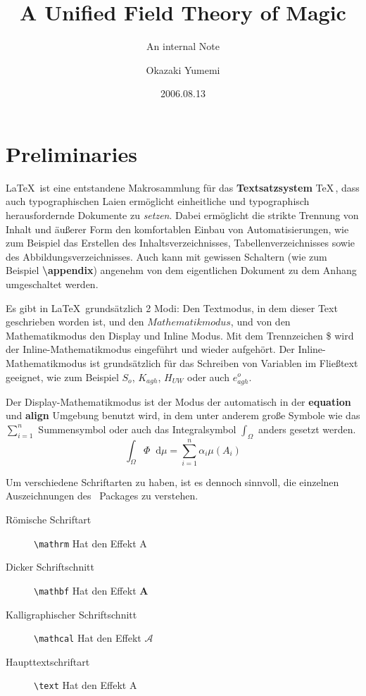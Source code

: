 \documentclass[logo/language=en]{tudcdartcl}
\title{A Unified Field Theory of Magic}
\subtitle{An internal Note}
\author{Okazaki Yumemi}
\date{2006.08.13}
\newcommand{\diff}{\mathop{}\!\mathrm{d}}
\begin{document}
\maketitle%

\section{Preliminaries}


\LaTeX\, ist eine entstandene Makrosammlung für das \textbf{Textsatzsystem} \TeX\,, dass auch typographischen Laien ermöglicht einheitliche und typographisch herausfordernde Dokumente zu \textit{setzen}.
Dabei ermöglicht die strikte Trennung von Inhalt und äußerer Form den komfortablen Einbau von Automatisierungen, wie zum Beispiel das Erstellen des Inhaltsverzeichnisses, Tabellenverzeichnisses sowie des Abbildungsverzeichnisses.
Auch kann mit gewissen Schaltern (wie zum Beispiel \textbf{\textbackslash appendix}) angenehm von dem eigentlichen Dokument zu dem Anhang umgeschaltet werden.


Es gibt in \LaTeX\, grundsätzlich 2 Modi: Den Textmodus, in dem dieser Text geschrieben worden ist, und den $Mathematikmodus$, und von den Mathematikmodus den Display und Inline Modus.
Mit dem Trennzeichen \$ wird der Inline-Mathematikmodus eingeführt und wieder aufgehört. Der Inline-Mathematikmodus ist grundsätzlich für das Schreiben von Variablen im Fließtext geeignet, wie zum Beispiel $S_o$, $K_{agh}$, $H_{UW}$ oder auch $e_{agh}^o$.

Der Display-Mathematikmodus ist der Modus der automatisch in der \textbf{equation} und \textbf{align} Umgebung benutzt wird, in dem unter anderem große Symbole wie das $\sum_{i=1}^n$ Summensymbol oder auch das Integralsymbol $\int_{\Omega}$ anders gesetzt werden.\begin{equation*}
    \int_{\Omega} \Phi \diff \mu = \sum_{i=1}^n \alpha_i \mu (A_i)
\end{equation*}

Um verschiedene Schriftarten zu haben, ist es dennoch sinnvoll, die einzelnen Auszeichnungen des \AmS \, Packages zu verstehen.
\begin{description}
    \item[Römische Schriftart] {\verb!\mathrm!} Hat den Effekt $\mathrm{A}$
    \item[Dicker Schriftschnitt] {\verb!\mathbf!} Hat den Effekt $\mathbf{A}$
    \item[Kalligraphischer Schriftschnitt] {\verb!\mathcal!} Hat den Effekt $\mathcal{A}$
    \item[Haupttextschriftart] {\verb!\text!} Hat den Effekt $\text{A}$
\end{description}
\end{document}
